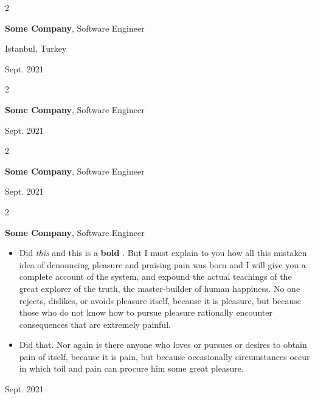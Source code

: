 \documentclass[10pt, letterpaper]{article}
\newenvironment{highlights}{
    \begin{itemize}[
        topsep=0.10 cm,
        parsep=0.10 cm,
        partopsep=0pt,
        itemsep=0pt,
        leftmargin=0.4 cm + 10pt
    ]
}{
    \end{itemize}
} %
\newenvironment{twocolentry}[2][]{
    \onecolentry
    \def\secondColumn{#2}
    \setcolumnwidth{\fill, 4.5 cm}
    \begin{paracol}{2}
}{
    \switchcolumn \raggedleft \secondColumn
    \end{paracol}
    \endonecolentry
} %
\let\hrefWithoutArrow\href
\renewcommand{\href}[2]{\hrefWithoutArrow{#1}{\mbox{\ifthenelse{\equal{#2}{}}{ }{#2 }\raisebox{.15ex}{\footnotesize \faExternalLink*}}}}
\begin{document}
        \vspace{0.2 cm}

        \begin{twocolentry}{
            Istanbul, Turkey

        Sept. 2021
        }
            \textbf{Some \textnormal{Company}}, Software Engineer
        \end{twocolentry}


        \vspace{0.2 cm}

        \begin{twocolentry}{
            Sept. 2021
        }
            \textbf{Some \textnormal{Company}}, Software Engineer
        \end{twocolentry}


        \vspace{0.2 cm}

        \begin{twocolentry}{
            Sept. 2021
        }
            \textbf{Some \textnormal{Company}}, Software Engineer
        \end{twocolentry}


        \vspace{0.2 cm}

        \begin{twocolentry}{
            Sept. 2021
        }
            \textbf{Some \textnormal{Company}}, Software Engineer
            \begin{highlights}
                \item Did \textit{this} and this is a \textbf{bold} \href{https://example.com}{link}. But I must explain to you how all this mistaken idea of denouncing pleasure and praising pain was born and I will give you a complete account of the system, and expound the actual teachings of the great explorer of the truth, the master-builder of human happiness. No one rejects, dislikes, or avoids pleasure itself, because it is pleasure, but because those who do not know how to pursue pleasure rationally encounter consequences that are extremely painful.
                \item Did that. Nor again is there anyone who loves or pursues or desires to obtain pain of itself, because it is pain, but because occasionally circumstances occur in which toil and pain can procure him some great pleasure.
            \end{highlights}
        \end{twocolentry}
\end{document}
